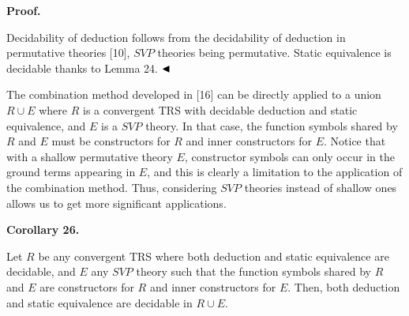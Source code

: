  
 
 
 
\par\medskip\noindent\textbf{Proof.}\par
 
 
Decidability of deduction follows from the decidability of deduction in permutative theories [10], $\mathit{SVP}$ theories being permutative. Static equivalence is decidable thanks to Lemma 24. $\hfill\blacktriangleleft$\par
 
 
 
The combination method developed in [16] can be directly applied to a union $R\cup E$ where $R$ is a convergent TRS with decidable deduction and static equivalence, and $E$ is a $\mathit{SVP}$ theory. In that case, the function symbols shared by $R$ and $E$ must be constructors for $R$ and inner constructors for $E$. Notice that with a shallow permutative theory $E$, constructor symbols can only occur in the ground terms appearing in $E$, and this is clearly a limitation to the application of the combination method. Thus, considering $\mathit{SVP}$ theories instead of shallow ones allows us to get more significant applications.\par
 
 
 
\par\medskip\noindent\textbf{Corollary 26.}\par
 
 
Let $R$ be any convergent TRS where both deduction and static equivalence are decidable, and $E$ any $\mathit{SVP}$ theory such that the function symbols shared by $R$ and $E$ are constructors for $R$ and inner constructors for $E$. Then, both deduction and static equivalence are decidable in $R\cup E$.\par
 
 
 
 
